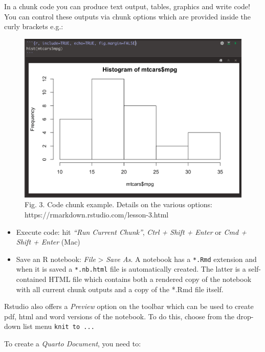 \documentclass[
  letterpaper,
  DIV=11,
  numbers=noendperiod,
  oneside]{scrreprt}
\begin{document}
In a chunk code you can produce text output, tables, graphics and write
code! You can control these outputs via chunk options which are provided
inside the curly brackets e.g.:

\begin{figure}[H]

{\centering \includegraphics{figs/ch2/codechunk.png}

}

\caption{Fig. 3. Code chunk example. Details on the various options:
https://rmarkdown.rstudio.com/lesson-3.html}

\end{figure}%

\begin{itemize}
\item
  Execute code: hit \emph{``Run Current Chunk''}, \emph{Ctrl + Shift +
  Enter} or \emph{Cmd + Shift + Enter} (Mac)
\item
  Save an R notebook: \emph{File} \textgreater{} \emph{Save As}. A
  notebook has a \texttt{*.Rmd} extension and when it is saved a
  \texttt{*.nb.html} file is automatically created. The latter is a
  self-contained HTML file which contains both a rendered copy of the
  notebook with all current chunk outputs and a copy of the *.Rmd file
  itself.
\end{itemize}

Rstudio also offers a \emph{Preview} option on the toolbar which can be
used to create pdf, html and word versions of the notebook. To do this,
choose from the drop-down list menu \texttt{knit\ to\ ...}

To create a \emph{Quarto Document}, you need to:
\end{document}
